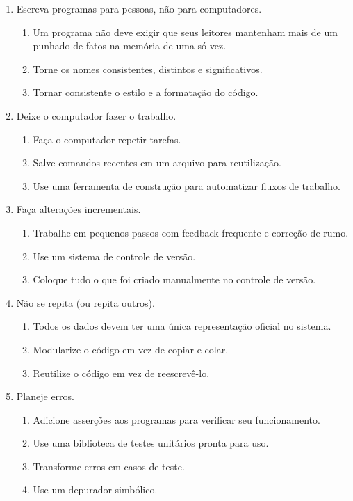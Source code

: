 \begin{tcolorbox}

\begin{enumerate}
\item Escreva programas para pessoas, não para computadores.
    \begin{enumerate}
        \item Um programa não deve exigir que seus leitores mantenham mais de um punhado de fatos na memória de uma só vez.
        \item Torne os nomes consistentes, distintos e significativos.
        \item Tornar consistente o estilo e a formatação do código.
    \end{enumerate}

\item Deixe o computador fazer o trabalho.
    \begin{enumerate}
        \item Faça o computador repetir tarefas.
        \item Salve comandos recentes em um arquivo para reutilização.
        \item Use uma ferramenta de construção para automatizar fluxos de trabalho.
    \end{enumerate}

\item Faça alterações incrementais.
    \begin{enumerate}
        \item Trabalhe em pequenos passos com feedback frequente e correção de rumo.
        \item Use um sistema de controle de versão.
        \item Coloque tudo o que foi criado manualmente no controle de versão.
    \end{enumerate}

\item Não se repita (ou repita outros).
    \begin{enumerate}
        \item Todos os dados devem ter uma única representação oficial no sistema.
        \item Modularize o código em vez de copiar e colar.
        \item Reutilize o código em vez de reescrevê-lo.
    \end{enumerate}

\item Planeje erros.
    \begin{enumerate}
        \item Adicione asserções aos programas para verificar seu funcionamento.
        \item Use uma biblioteca de testes unitários pronta para uso.
        \item Transforme erros em casos de teste.
        \item Use um depurador simbólico.
    \end{enumerate}


\end{enumerate}
\end{tcolorbox}
